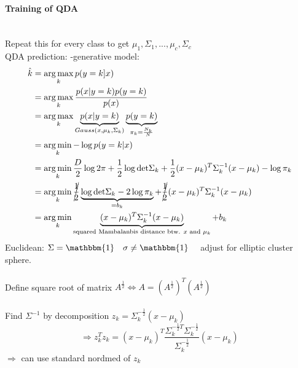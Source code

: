 \documentclass[11pt]{article}
\DeclareMathOperator*{\argmin}{arg\,min}
\DeclareMathOperator*{\argmax}{arg\,max}
\begin{document}
        \paragraph{Training of QDA} \\
          Repeat this for every class to get $\mu_1,\Sigma_1,...,\mu_c,\Sigma_c$ \\
          QDA prediction: -generative model:
          \begin{equation*}
            \begin{align*}
              \hat{k} &= \argmax_k p(y=k]x) \\
              &= \argmax_k \frac{p(x|y=k)p(y=k)}{p(x)} \\
              &= \argmax_k \underbrace{p(x|y=k)}_{Gauss(x,\mu_k,\Sigma_k)}\underbrace{p(y=k)}_{\pi_k= \frac{N_k}{N}} \\
              &= \argmin_k -\log p(y=k|x) \\
              &= \argmin_k \frac{D}{2} \log 2\pi+\frac{1}{2} \log \text{det} \Sigma_k+\frac{1}{2}(x-\mu_k)^T\Sigma_k^{-1}(x-\mu_k)-\log \pi_k \\
              &= \argmin_k \cancel{\frac{1}{2}}\underbrace{\log \text{det} \Sigma_k -2 \log \pi_k}_{=b_k} + \cancel{\frac{1}{2}} (x-\mu_k)^T\Sigma_k^{-1}(x-\mu_k) \\
              &= \argmin_k \underbrace{(x-\mu_k)^T\Sigma_k^{-1}(x-\mu_k)}_{\text{squared Mambalanbis distance btw. }x \text{ and } \mu_k} + b_k
            \end{align*}
          \end{equation*}
          Euclidean: $\Sigma = \mathbbm{1} \quad \sigma \neq \mathbbm{1} \quad$ adjust for elliptic cluster sphere. \\ \\
          Define square root of matrix $A^{\frac{1}{2}} \iff A=(A^{\frac{1}{2}})^T(A^{\frac{1}{2}})$ \\ \\
          Find $\Sigma^{-1}$ by decomposition $z_k=\Sigma_k^{-\frac{1}{2}}(x-\mu_k)$ \\
          \begin{equation*}
            \Rightarrow z_k^Tz_k=(x-\mu_k)^T\frac{\Sigma_k^{-\frac{1}{2}T}\Sigma_k^{-\frac{1}{2}}}{\Sigma_k^{-\frac{1}{2}}}(x-\mu_k)
          \end{equation*}
          $\Rightarrow$ can use standard nordmed of $z_k$
\end{document}
